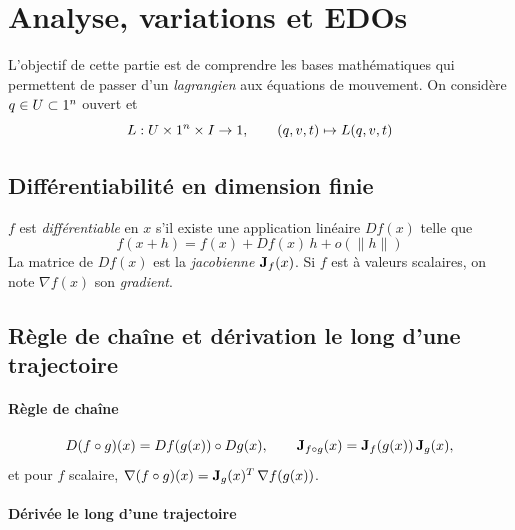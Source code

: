 \newpage
\section{Analyse, variations et EDOs}

L'objectif de cette partie est de comprendre
les bases mathématiques qui permettent de passer
d'un \emph{lagrangien} aux équations de mouvement.
On considère $q\in U\subset1^n$ ouvert
et
\[
    L : U\times1^n\times I\to1,
    \qquad (q,v,t)\mapsto L(q,v,t)
\]

\subsection{Différentiabilité en dimension finie}

\begin{definition}[Différentiabilité]
    $f$ est \emph{différentiable} en $x$ s'il existe une application
    linéaire $Df(x)$ telle que
    \[
        f(x+h) = f(x) + Df(x)\,h + o(\|h\|)
    \]
    La matrice de $Df(x)$ est la \emph{jacobienne} $\mathbf{J}_f(x)$. Si
    $f$ est à valeurs scalaires, on note $\nabla f(x)$ son
    \emph{gradient}.
\end{definition}

\subsection{Règle de chaîne et dérivation le long d'une trajectoire}

\paragraph{Règle de chaîne}

\begin{theoreme}
    \[
        D(f\circ g)(x) = Df(g(x))\circ Dg(x),
        \qquad
        \mathbf{J}_{f\circ g}(x) = \mathbf{J}_f(g(x))\,\mathbf{J}_g(x),
    \]
    et pour $f$ scalaire,
    $\nabla(f\circ g)(x) = \mathbf{J}_g(x)^T\,\nabla f(g(x))$.
\end{theoreme}

\paragraph{Dérivée le long d'une trajectoire}

